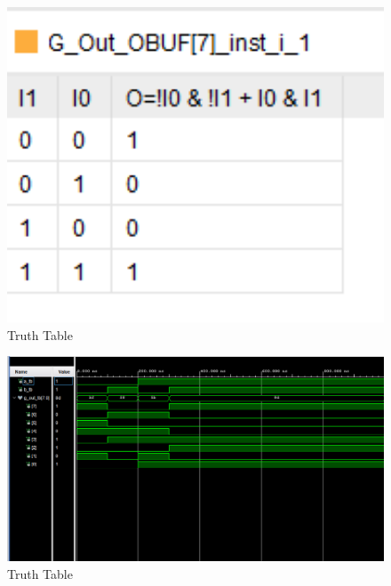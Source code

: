 \documentclass{article}
\begin{document}
\begin{figure}[h]
\begin{center}
\includegraphics[width=1\textwidth]{GatesTruthTableCont6.png} %
\caption{Truth Table}
\end{center}
\end{figure}

\begin{figure}[h]
\begin{center}
\includegraphics[width=1\textwidth]{GatesWaveForm.png} %
\caption{Truth Table}
\end{center}
\end{figure}
\end{document}
